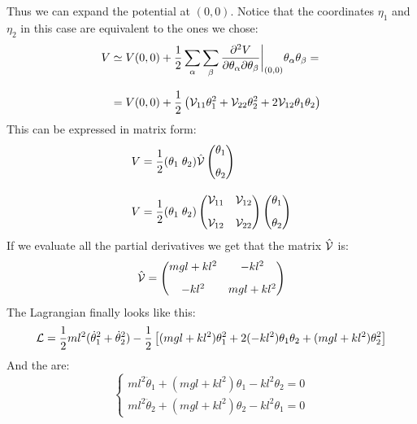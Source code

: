 Thus we can expand the potential at $(0,0)$. Notice that the coordinates $\eta_1$ and $\eta_2$ in this case are equivalent to the ones we chose:
\begin{equation}
    \begin{split}
        V &\simeq V(0,0) +\dfrac{1}{2}\displaystyle\sum_{\alpha}\displaystyle\sum_{\beta} \dfrac{\partial^2 V}{\partial \theta_{\alpha} \partial \theta_{\beta}}\bigg|_{(0,0)}\theta_{\alpha}\theta_{\beta} = \\[8pt]
        &= V(0,0) +\dfrac{1}{2}\left(\mathcal{V}_{11}\theta_1^2 + \mathcal{V}_{22}\theta_2^2 + 2\mathcal{V}_{12}\theta_1\theta_2\right)
    \end{split}
\end{equation}
This can be expressed in matrix form:
\begin{equation}
    \begin{split}
        V &= \dfrac{1}{2}(\theta_1\;\theta_2)\hat{\mathcal{V}}\begin{pmatrix}
            \theta_1 \\[8pt]
            \theta_2
        \end{pmatrix}\\[8pt]
        V &= \dfrac{1}{2}(\theta_1\;\theta_2)\begin{pmatrix}
            \mathcal{V}_{11} & \mathcal{V}_{12}\\[8pt]
            \mathcal{V}_{12} & \mathcal{V}_{22}
        \end{pmatrix} \begin{pmatrix}
            \theta_1 \\[8pt]
            \theta_2
        \end{pmatrix}
    \end{split}
\end{equation}
If we evaluate all the partial derivatives we get that the matrix $\hat{\mathcal{V}}$ is:
\begin{equation}
    \hat{\mathcal{V}} = \begin{pmatrix}
        mgl+kl^2 & -kl^2\\[8pt]
        -kl^2 & mgl+kl^2
    \end{pmatrix}
\end{equation}
The Lagrangian finally looks like this:
\begin{equation}
    \mathcal{L} = \dfrac{1}{2}ml^2(\dot{\theta}_1^2+\dot{\theta}_2^2) - \dfrac{1}{2}\left[(mgl+kl^2)\theta_1^2 + 2(-kl^2)\theta_1\theta_2 + (mgl+kl^2)\theta_2^2 \right]
\end{equation}
And the \eleref\;are:
\begin{equation}
    \begin{cases}
        ml^2\ddot{\theta}_1 + (mgl + kl^2)\theta_1 - kl^2\theta_2 = 0\\[8pt]
        ml^2\ddot{\theta}_2 + (mgl + kl^2)\theta_2 - kl^2\theta_1 = 0
    \end{cases}
\end{equation}
